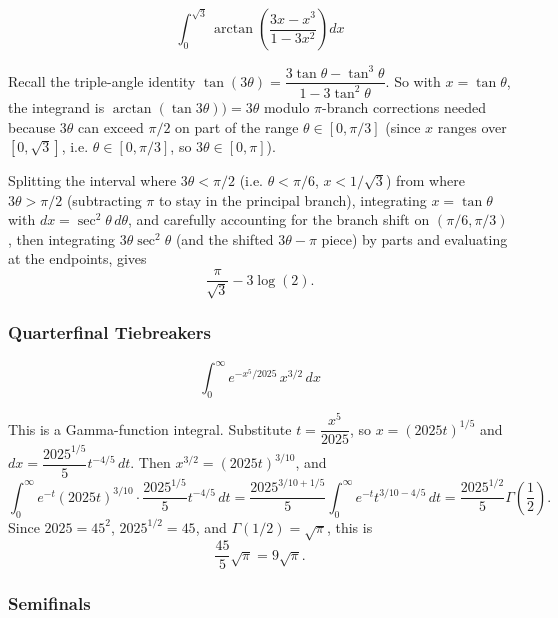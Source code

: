 \begin{questions}
\question
\[
\int_0^{\sqrt3} \arctan\!\left(\frac{3x-x^{3}}{1-3x^{2}}\right)dx
\]
\begin{solution}
Recall the triple-angle identity $\tan(3\theta)=\dfrac{3\tan\theta-\tan^3\theta}{1-3\tan^2\theta}$. So with $x=\tan\theta$, the integrand is $\arctan(\tan3\theta))=3\theta$ modulo $\pi$-branch corrections needed because $3\theta$ can exceed $\pi/2$ on part of the range $\theta\in[0,\pi/3]$ (since $x$ ranges over $[0,\sqrt3]$, i.e. $\theta\in[0,\pi/3]$, so $3\theta\in[0,\pi]$).

Splitting the interval where $3\theta<\pi/2$ (i.e. $\theta<\pi/6$, $x<1/\sqrt3$) from where $3\theta>\pi/2$ (subtracting $\pi$ to stay in the principal branch), integrating $x=\tan\theta$ with $dx=\sec^2\theta\,d\theta$, and carefully accounting for the branch shift on $(\pi/6,\pi/3)$, then integrating $3\theta\sec^2\theta$ (and the shifted $3\theta-\pi$ piece) by parts and evaluating at the endpoints, gives
\[
\frac{\pi}{\sqrt3}-3\log(2).
\]
\end{solution}

\end{questions}

\subsubsection*{Quarterfinal Tiebreakers}

\begin{questions}

\question
\[
\int_0^{\infty} e^{-x^{5}/2025}\,x^{3/2}\,dx
\]
\begin{solution}
This is a Gamma-function integral. Substitute $t=\dfrac{x^5}{2025}$, so $x=(2025t)^{1/5}$ and $dx=\dfrac{2025^{1/5}}{5}t^{-4/5}\,dt$. Then $x^{3/2}=(2025t)^{3/10}$, and
\[
\int_0^\infty e^{-t}(2025t)^{3/10}\cdot\frac{2025^{1/5}}{5}t^{-4/5}\,dt=\frac{2025^{3/10+1/5}}{5}\int_0^\infty e^{-t}t^{3/10-4/5}\,dt=\frac{2025^{1/2}}{5}\Gamma\!\left(\frac{1}{2}\right).
\]
Since $2025=45^2$, $2025^{1/2}=45$, and $\Gamma(1/2)=\sqrt\pi$, this is
\[
\frac{45}{5}\sqrt\pi=9\sqrt\pi.
\]
\end{solution}

\end{questions}

\subsubsection*{Semifinals}

